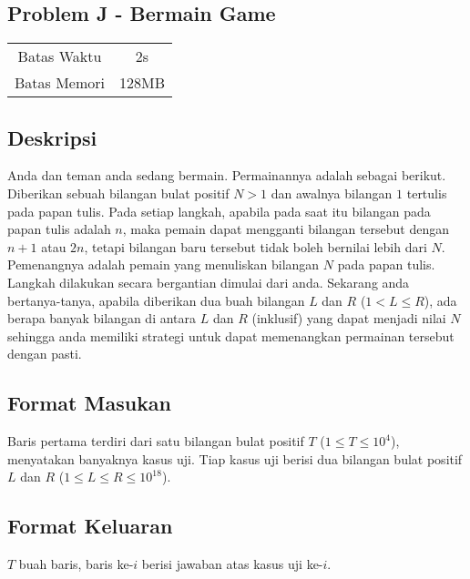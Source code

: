 \documentclass{article}
\begin{document}
\begin{center}
    \section*{Problem J - Bermain Game} %

    \begin{tabular}{ | c c | }
        \hline
        Batas Waktu  & 2s \\    %
        Batas Memori & 128MB \\  %
        \hline
    \end{tabular}
\end{center}

\subsection*{Deskripsi}

Anda dan teman anda sedang bermain. Permainannya adalah sebagai berikut. Diberikan sebuah bilangan bulat positif $N > 1$ dan awalnya bilangan $1$ tertulis pada papan tulis. Pada setiap langkah, apabila pada saat itu bilangan pada papan tulis adalah $n$, maka pemain dapat mengganti bilangan tersebut dengan $n+1$ atau $2n$, tetapi bilangan baru tersebut tidak boleh bernilai lebih dari $N$. Pemenangnya adalah pemain yang menuliskan bilangan $N$ pada papan tulis. Langkah dilakukan secara bergantian dimulai dari anda. Sekarang anda bertanya-tanya, apabila diberikan dua buah bilangan $L$ dan $R$ ($1 < L \le R$), ada berapa banyak bilangan di antara $L$ dan $R$ (inklusif) yang dapat menjadi nilai $N$ sehingga anda memiliki strategi untuk dapat memenangkan permainan tersebut dengan pasti. 

\subsection*{Format Masukan}

Baris pertama terdiri dari satu bilangan bulat positif $T$ ($1 \leq T \leq 10^4$), menyatakan banyaknya kasus uji.
Tiap kasus uji berisi dua bilangan bulat positif $L$ dan $R$ ($1 \leq L \leq R \leq 10^{18}$).

\subsection*{Format Keluaran}

$T$ buah baris, baris ke-$i$ berisi jawaban atas kasus uji ke-$i$.
\end{document}

